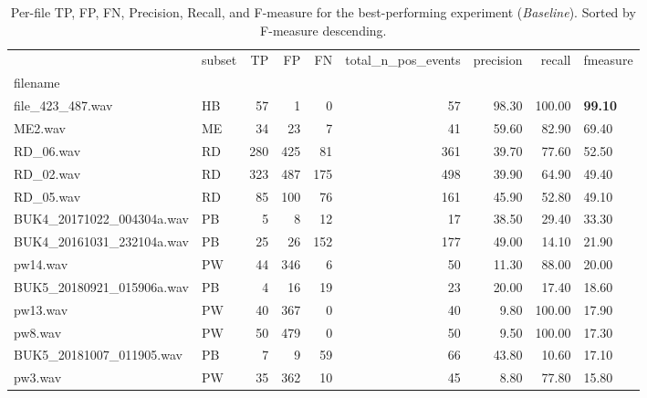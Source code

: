 \begin{table}
\centering
\caption{Per-file TP, FP, FN, Precision, Recall, and F-measure for the best-performing experiment (\emph{Baseline}). Sorted by F-measure descending.}
\label{tab:per_file}
\begin{tabular}{llrrrrrrl}
\toprule
{} & subset &   TP &    FP &   FN &  total_n_pos_events &  precision &  recall &        fmeasure \\
filename                  &        &      &       &      &                     &            &         &                 \\
\midrule
file_423_487.wav          &     HB &   57 &     1 &    0 &                  57 &      98.30 &  100.00 &  \textbf{99.10} \\
ME2.wav                   &     ME &   34 &    23 &    7 &                  41 &      59.60 &   82.90 &           69.40 \\
RD_06.wav                 &     RD &  280 &   425 &   81 &                 361 &      39.70 &   77.60 &           52.50 \\
RD_02.wav                 &     RD &  323 &   487 &  175 &                 498 &      39.90 &   64.90 &           49.40 \\
RD_05.wav                 &     RD &   85 &   100 &   76 &                 161 &      45.90 &   52.80 &           49.10 \\
BUK4_20171022_004304a.wav &     PB &    5 &     8 &   12 &                  17 &      38.50 &   29.40 &           33.30 \\
BUK4_20161031_232104a.wav &     PB &   25 &    26 &  152 &                 177 &      49.00 &   14.10 &           21.90 \\
pw14.wav                  &     PW &   44 &   346 &    6 &                  50 &      11.30 &   88.00 &           20.00 \\
BUK5_20180921_015906a.wav &     PB &    4 &    16 &   19 &                  23 &      20.00 &   17.40 &           18.60 \\
pw13.wav                  &     PW &   40 &   367 &    0 &                  40 &       9.80 &  100.00 &           17.90 \\
pw8.wav                   &     PW &   50 &   479 &    0 &                  50 &       9.50 &  100.00 &           17.30 \\
BUK5_20181007_011905.wav  &     PB &    7 &     9 &   59 &                  66 &      43.80 &   10.60 &           17.10 \\
pw3.wav                   &     PW &   35 &   362 &   10 &                  45 &       8.80 &   77.80 &           15.80 \\

\end{tabular}
\end{table}
